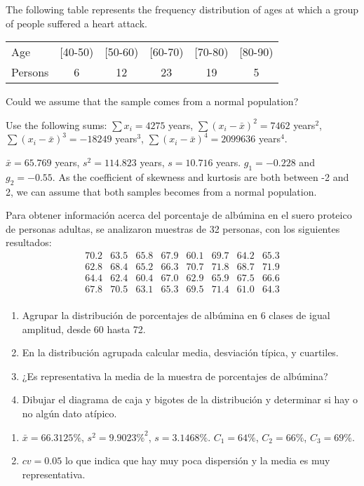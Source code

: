 {The following table represents the frequency distribution of ages at which a group of people suffered a heart
attack.
\begin{center}
\begin{tabular}{lccccc}
\toprule
Age & [40-50) & [50-60) & [60-70) & [70-80) & [80-90)  \\
Persons & 6 & 12 & 23 & 19 & 5  \\
\bottomrule
\end{tabular}
\end{center}

Could we assume that the sample comes from a normal population?

Use the following sums: $\sum x_i= 4275$ years, $\sum (x_i-\bar x)^2=7462$ years$^2$, $\sum (x_i-\bar x)^3=-18249$
years$^3$, $\sum (x_i-\bar x)^4=2099636$ years$^4$.
}
{
$\bar x= 65.769$ years, $s^2= 114.823$ years, $s=10.716$ years. $g_1=-0.228$ and $g_2=-0.55$.
As the coefficient of skewness and kurtosis are both between -2 and 2, we can assume that both samples becomes from a normal population.
}
{}


{Para obtener información acerca del porcentaje de albúmina en el suero proteico de personas adultas, se analizaron muestras de 32 personas, con los siguientes resultados:
\[
\begin{array}{cccccccc}
70.2 & 63.5 & 65.8 & 67.9 & 60.1 & 69.7 & 64.2 & 65.3 \\
62.8 & 68.4 & 65.2 & 66.3 & 70.7 & 71.8 & 68.7 & 71.9 \\
64.4 & 62.4 & 60.4 & 67.0 & 62.9 & 65.9 & 67.5 & 66.6 \\
67.8 & 70.5 & 63.1 & 65.3 & 69.5 & 71.4 & 61.0 & 64.3 \\
\end{array}
\]
\begin{enumerate}
\item Agrupar la distribución de porcentajes de albúmina en 6 clases de igual amplitud, desde 60 hasta 72.
\item En la distribución agrupada calcular media, desviación típica, y cuartiles.
\item ¿Es representativa la media de la muestra de porcentajes de albúmina?
\item Dibujar el diagrama de caja y bigotes de la distribución y determinar si hay o no algún dato atípico.
\end{enumerate}
}
{\begin{enumerate}[start=2]
\item $\bar x=66.3125\%$, $s^2=9.9023\%^2$, $s=3.1468\%$. $C_1=64\%$, $C_2=66\%$, $C_3=69\%$.
\item $cv=0.05$ lo que indica que hay muy poca dispersión y la media es muy representativa.
\end{enumerate}
}
{}


